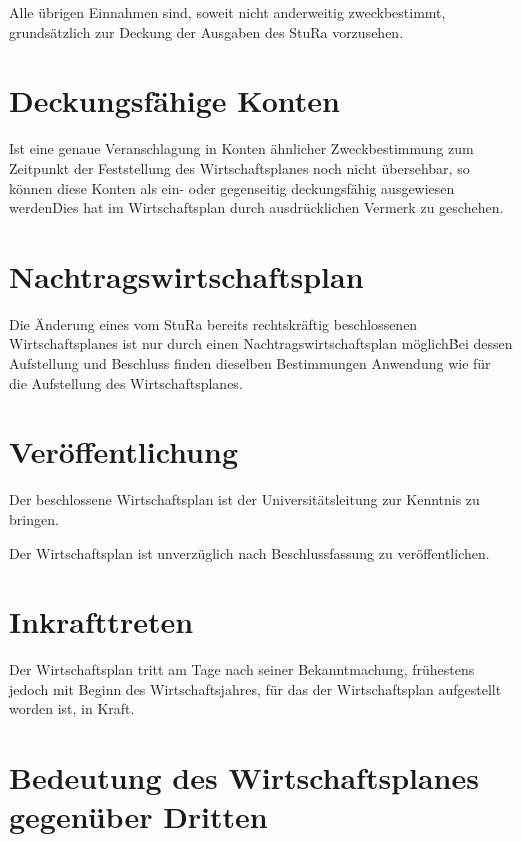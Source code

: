 \begin{multicols}{2}
\Abs \Satz Alle übrigen Einnahmen sind, soweit nicht anderweitig zweckbestimmt, grundsätzlich zur Deckung der Ausgaben des StuRa vorzusehen.



\section{Deckungsfähige Konten}

\Abs \Satz Ist eine genaue Veranschlagung in Konten ähnlicher Zweckbestimmung zum Zeitpunkt der Feststellung des Wirtschaftsplanes noch nicht übersehbar, so können diese Konten als ein- oder gegenseitig deckungsfähig ausgewiesen werden\. Dies hat im Wirtschaftsplan durch ausdrücklichen Vermerk zu geschehen.



\section{Nachtragswirtschaftsplan}

\Abs \Satz Die Änderung eines vom StuRa bereits rechtskräftig beschlossenen Wirtschaftsplanes ist nur durch einen Nachtragswirtschaftsplan möglich\. Bei dessen Aufstellung und Beschluss finden dieselben Bestimmungen Anwendung wie für die Aufstellung des Wirtschaftsplanes.



\section{Veröffentlichung}

\Abs \Satz Der beschlossene Wirtschaftsplan ist der Universitätsleitung zur Kenntnis zu bringen.

\Abs \Satz Der Wirtschaftsplan ist unverzüglich nach Beschlussfassung zu veröffentlichen.



\section{Inkrafttreten}

\Abs \Satz Der Wirtschaftsplan tritt am Tage nach seiner Bekanntmachung, frühestens jedoch mit Beginn des Wirtschaftsjahres, für das der Wirtschaftsplan aufgestellt worden ist, in Kraft.



\section{Bedeutung des Wirtschaftsplanes gegenüber Dritten}


\end{multicols}
